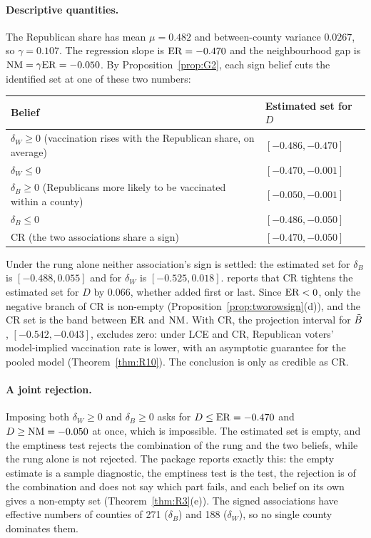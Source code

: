 \paragraph{Descriptive quantities.} The Republican share has mean $\mu=0.482$ and
between-county variance $0.0267$, so $\gamma=0.107$. The regression slope is
$\mathrm{ER}=-0.470$ and the neighbourhood gap is $\mathrm{NM}=\gamma\mathrm{ER}=-0.050$. By
Proposition~\ref{prop:G2}, each sign belief cuts the identified set at one of these
two numbers:
\begin{center}\small
\begin{tabular}{@{}ll@{}}
\toprule
Belief & Estimated set for $D$ \\
\midrule
$\delta_W\ge0$ (vaccination rises with the Republican share, on average) & $[-0.486,-0.470]$ \\
$\delta_W\le0$ & $[-0.470,-0.001]$ \\
$\delta_B\ge0$ (Republicans more likely to be vaccinated within a county) & $[-0.050,-0.001]$ \\
$\delta_B\le0$ & $[-0.486,-0.050]$ \\
CR (the two associations share a sign) & $[-0.470,-0.050]$ \\
\bottomrule
\end{tabular}
\end{center}
Under the rung alone neither association's sign is settled: the estimated set for
$\delta_B$ is $[-0.488,0.055]$ and for $\delta_W$ is $[-0.525,0.018]$.
 reports that CR tightens the estimated set for $D$ by 0.066,
whether added first or last. Since $\mathrm{ER}<0$, only the negative branch of CR is
non-empty (Proposition~\ref{prop:tworowsign}(d)), and the CR set is the band between
$\mathrm{ER}$ and $\mathrm{NM}$. With CR, the projection interval for $\tilde B$, $[-0.542,-0.043]$,
excludes zero: under LCE and CR, Republican voters' model-implied vaccination rate
is lower, with an asymptotic guarantee for the pooled model
(Theorem~\ref{thm:R10}). The conclusion is only as credible as CR.

\paragraph{A joint rejection.} Imposing both $\delta_W\ge0$ and $\delta_B\ge0$ asks
for $D\le\mathrm{ER}=-0.470$ and $D\ge\mathrm{NM}=-0.050$ at once, which is impossible. The estimated
set is empty, and the emptiness test rejects the combination of the rung and the two
beliefs, while the rung alone is not rejected. The package reports exactly this: the
empty estimate is a sample diagnostic, the emptiness test is the test, the rejection
is of the combination and does not say which part fails, and each belief on its own
gives a non-empty set (Theorem~\ref{thm:R3}(e)). The signed associations have
effective numbers of counties of 271 ($\delta_B$) and 188 ($\delta_W$), so no single
county dominates them.
